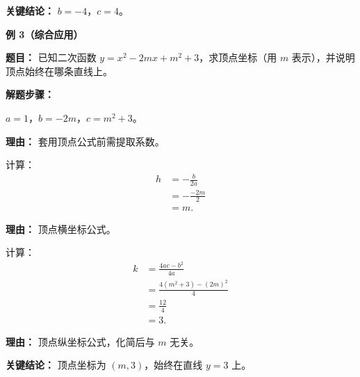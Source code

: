 \begin{examplebox}
	\textbf{\textcolor{CExample}{关键结论：}}
	$b=-4$，$c=4$。

	\medskip
	\textbf{\textcolor{CExample}{例 3（综合应用）}}

	\textbf{\textcolor{CExample}{题目：}}
	已知二次函数 $y = x^2 - 2mx + m^2 + 3$，求顶点坐标（用 $m$ 表示），并说明顶点始终在哪条直线上。

	\textbf{\textcolor{CExample}{解题步骤：}}
	\begin{description}[style=nextline, leftmargin=2.8em, labelsep=0.5em, itemsep=0.45em]
		\item[\textbf{第一步（识别系数）：}] $a=1$，$b=-2m$，$c=m^2+3$。
			\par\textbf{理由：} 套用顶点公式前需提取系数。
		\item[\textbf{第二步（求横坐标）：}] 计算：
			\[
				\begin{aligned}
					h &= -\frac{b}{2a} \\
					&= -\frac{-2m}{2} \\
					&= m.
			\end{aligned}
			\]
			\par\textbf{理由：} 顶点横坐标公式。
		\item[\textbf{第三步（求纵坐标）：}] 计算：
			\[
				\begin{aligned}
					k &= \frac{4ac-b^2}{4a} \\
					&= \frac{4(m^2+3) - (2m)^2}{4} \\
					&= \frac{12}{4} \\
					&= 3.
			\end{aligned}
			\]
			\par\textbf{理由：} 顶点纵坐标公式，化简后与 $m$ 无关。
	\end{description}

	\textbf{\textcolor{CExample}{关键结论：}}
	顶点坐标为 $(m,3)$，始终在直线 $y=3$ 上。

\end{examplebox}
